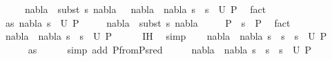 \begin{isabellebody}
\ \ \ \ \ nabla{}\ {\isasymTurnstile}\ {\isacharparenleft}{\kern0pt}subst\ s{}{\isacharparenright}{\kern0pt}\ nabla{}\ \ {\isasymLongrightarrow}\ {\isacharparenleft}{\kern0pt}nabla{}\ {\isasymunion}\ nabla{}{\isacharcomma}{\kern0pt}\ s{}\ {\isasymbullet}\ s{}{\isacharparenright}{\kern0pt}\ {\isasymin}\ U\ P{}{\isachardoublequoteclose}\ \isamarkupfalse%
\ fact{\isacharplus}{\kern0pt}\isanewline
\ \ \isamarkupfalse%
\ as{\isacharcolon}{\kern0pt}\ {\isachardoublequoteopen}{\isacharparenleft}{\kern0pt}nabla{}{\isacharcomma}{\kern0pt}\ s{}{\isacharparenright}{\kern0pt}\ {\isasymin}\ U\ P{}{\isachardoublequoteclose}\ \isanewline
\ \ \ \ {\isachardoublequoteopen}nabla{}\ {\isasymTurnstile}\ {\isacharparenleft}{\kern0pt}subst\ s{}{\isacharparenright}{\kern0pt}\ nabla{}{\isachardoublequoteclose}\ \isanewline
\ \ \ \ {\isachardoublequoteopen}P{}\ {\isasymturnstile}\ s\ {\isasymleadsto}\ P{}{\isachardoublequoteclose}\ \isamarkupfalse%
\ fact{\isacharplus}{\kern0pt}\isanewline
\ \ \isamarkupfalse%
\ {\isachardoublequoteopen}{\isacharparenleft}{\kern0pt}nabla{}\ {\isasymunion}\ nabla{}{\isacharcomma}{\kern0pt}\ s{}\ {\isasymbullet}\ s{}{\isacharparenright}{\kern0pt}\ {\isasymin}\ U\ P{}{\isachardoublequoteclose}\isanewline
\ \ \ \ \isamarkupfalse%
\ IH\ \isamarkupfalse%
\ simp\isanewline
\ \ \isamarkupfalse%
\ {\isachardoublequoteopen}{\isacharparenleft}{\kern0pt}nabla{}\ {\isasymunion}\ nabla{}{\isacharcomma}{\kern0pt}\ {\isacharparenleft}{\kern0pt}s{}\ {\isasymbullet}\ s{}{\isacharparenright}{\kern0pt}\ {\isasymbullet}\ s{\isacharparenright}{\kern0pt}\ {\isasymin}\ U\ P{}{\isachardoublequoteclose}\isanewline
\ \ \ \ \isamarkupfalse%
\ as{\isacharparenleft}{\kern0pt}{}{\isacharparenright}{\kern0pt}\isanewline
\ \ \ \ \isamarkupfalse%
\ {\isacharparenleft}{\kern0pt}simp\ add{\isacharcolon}{\kern0pt}\ P{}{\isacharunderscore}{\kern0pt}from{\isacharunderscore}{\kern0pt}P{}{\isacharunderscore}{\kern0pt}sred{\isacharparenright}{\kern0pt}\isanewline
\ \ \isamarkupfalse%
\ \isamarkupfalse%
\ {\isachardoublequoteopen}{\isacharparenleft}{\kern0pt}nabla{}\ {\isasymunion}\ nabla{}{\isacharcomma}{\kern0pt}\ s{}\ {\isasymbullet}\ {\isacharparenleft}{\kern0pt}s{}\ {\isasymbullet}\ s{\isacharparenright}{\kern0pt}{\isacharparenright}{\kern0pt}\ {\isasymin}\ U\ P{}{\isachardoublequoteclose}\isanewline

\end{isabellebody}
